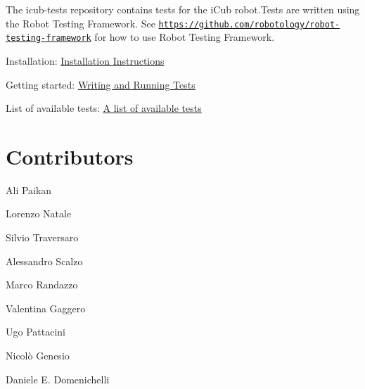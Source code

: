 The {\ttfamily icub-\/tests} repository contains tests for the i\+Cub robot.\+Tests are written using the Robot Testing Framework. See \href{https://github.com/robotology/robot-testing-framework}{\tt https\+://github.\+com/robotology/robot-\/testing-\/framework} for how to use Robot Testing Framework.

\begin{DoxyItemize}
\item Installation\+: \hyperlink{installation}{Installation Instructions} \item Getting started\+: \hyperlink{writing-and-running}{Writing and Running Tests} \item List of available tests\+: \hyperlink{group__icub-tests}{A list of available tests}\end{DoxyItemize}
\hypertarget{index_contributors}{}\section{Contributors}\label{index_contributors}
\begin{DoxyItemize}
\item Ali Paikan \item Lorenzo Natale \item Silvio Traversaro \item Alessandro Scalzo \item Marco Randazzo \item Valentina Gaggero \item Ugo Pattacini \item Nicolò Genesio \item Daniele E. Domenichelli \end{DoxyItemize}
